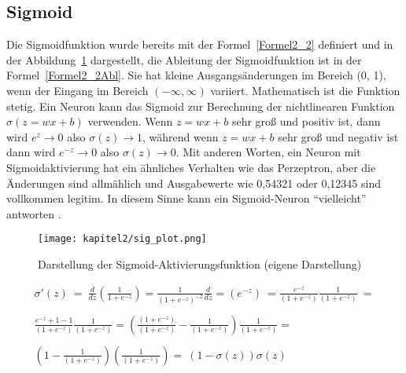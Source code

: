 \subsection{Sigmoid}
Die Sigmoidfunktion wurde bereits mit der Formel~\ref{Formel2_2} definiert und in der Abbildung~\ref{Kap2:Sigmoid_plot} dargestellt, die Ableitung der Sigmoidfunktion ist in der Formel~\ref{Formel2_2Abl}. Sie hat kleine Ausgangsänderungen im Bereich (0, 1), wenn der Eingang im Bereich $(-\infty, \infty)$ variiert. Mathematisch ist die Funktion stetig. Ein Neuron kann das Sigmoid zur Berechnung der nichtlinearen Funktion $\sigma(z = wx + b)$ verwenden.
Wenn $z = wx + b$ sehr groß und positiv ist, dann wird $e^z \rightarrow 0$ also $\sigma(z) \rightarrow 1$, während wenn $z = wx + b$ sehr groß und negativ ist dann wird $e^{-z} \rightarrow 0$ also $\sigma(z) \rightarrow 0$. Mit anderen Worten, ein Neuron mit Sigmoidaktivierung hat ein ähnliches Verhalten wie das Perzeptron, aber die Änderungen sind allmählich und Ausgabewerte wie 0,54321 oder 0,12345 sind vollkommen legitim. In diesem Sinne kann ein Sigmoid-Neuron \enquote{vielleicht} antworten \cite*[10]{AntonioGuili;AmitaKapoor;SujitPal2019}.
\begin{figure}[H]
    \centering
    \texttt{[image: kapitel2/sig\_plot.png]}
    \caption[Darstellung der Sigmoid-Aktivierungsfunktion]{Darstellung der Sigmoid-Aktivierungsfunktion (eigene Darstellung)}
    \label{Kap2:Sigmoid_plot}
\end{figure}


\begin{equation} \label{Formel2_2Abl}
    \begin{array}{ c }
        \sigma '(z)\ =\ \frac{d}{dz}\left(\frac{1}{1+e^{-z}}\right) =\frac{1}{\left( 1+e^{-z}\right)^{-2}}\frac{d}{dz} =\left( e^{-z}\right) \ =\frac{e^{-z}}{\left( 1+e^{-z}\right)}\frac{1}{\left( 1+e^{-z}\right)} \ =  \\
        \\
        \frac{e^{-z} +1-1}{\left( 1+e^{-z}\right)}\frac{1}{\left( 1+e^{-z}\right)} =\left(\frac{\left( 1+e^{-z}\right)}{\left( 1+e^{-z}\right)} -\frac{1}{\left( 1+e^{-z}\right)}\right)\frac{1}{\left( 1+e^{-z}\right)} = \\
        \\
        \left( 1-\frac{1}{\left( 1+e^{-z}\right)}\right)\left(\frac{1}{\left( 1+e^{-z}\right)}\right) =\ (1-\sigma (z))\sigma (z)
    \end{array}
\end{equation}

